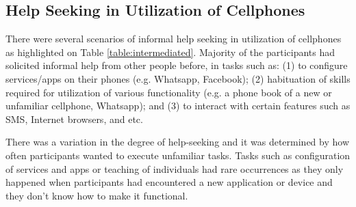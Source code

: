 \subsection{Help Seeking in Utilization of Cellphones}
There were several scenarios of informal help seeking in utilization of cellphones as highlighted on Table \ref{table:intermediated}. Majority of the participants had solicited  informal help from other people before, in tasks such as: (1) to configure services/apps on their phones (e.g. Whatsapp, Facebook); (2) habituation of skills required for utilization of various functionality (e.g. a phone book of a new or unfamiliar cellphone, Whatsapp); and (3) to interact with certain features such as SMS, Internet browsers, and etc.

There was a variation in the degree of help-seeking and it was determined by how often participants wanted to execute unfamiliar tasks. Tasks such as configuration of services and apps or teaching of individuals had rare occurrences as they only happened when participants had encountered a new application or device and they don't know how to make it functional. 


